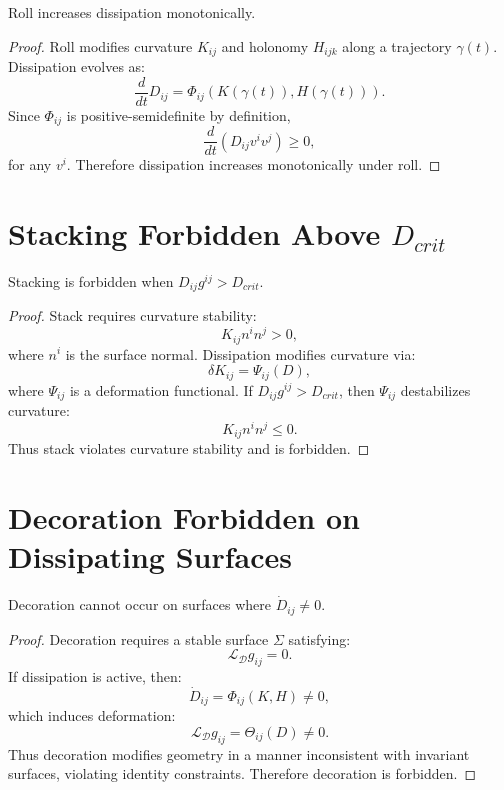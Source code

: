 \documentclass[12pt]{article}
\begin{document}
\begin{lemma}
Roll increases dissipation monotonically.
\end{lemma}

\begin{proof}
Roll modifies curvature $K_{ij}$ and holonomy $H_{ijk}$ along a trajectory
$\gamma(t)$. Dissipation evolves as:
\[
\frac{d}{dt} D_{ij} = \Phi_{ij}(K(\gamma(t)), H(\gamma(t))).
\]
Since $\Phi_{ij}$ is positive-semidefinite by definition,
\[
\frac{d}{dt} (D_{ij} v^i v^j) \ge 0,
\]
for any $v^i$. Therefore dissipation increases monotonically under roll.
\end{proof}

\section{Stacking Forbidden Above $D_{crit}$}

\begin{lemma}
Stacking is forbidden when $D_{ij} g^{ij} > D_{crit}$.
\end{lemma}

\begin{proof}
Stack requires curvature stability:
\[
K_{ij} n^i n^j > 0,
\]
where $n^i$ is the surface normal. Dissipation modifies curvature via:
\[
\delta K_{ij} = \Psi_{ij}(D),
\]
where $\Psi_{ij}$ is a deformation functional. If $D_{ij} g^{ij} > D_{crit}$,
then $\Psi_{ij}$ destabilizes curvature:
\[
K_{ij} n^i n^j \le 0.
\]
Thus stack violates curvature stability and is forbidden.
\end{proof}

\section{Decoration Forbidden on Dissipating Surfaces}

\begin{theorem}
Decoration cannot occur on surfaces where $\dot{D}_{ij} \neq 0$.
\end{theorem}

\begin{proof}
Decoration requires a stable surface $\Sigma$ satisfying:
\[
\mathcal{L}_{\mathcal{D}} g_{ij} = 0.
\]
If dissipation is active, then:
\[
\dot{D}_{ij} = \Phi_{ij}(K, H) \neq 0,
\]
which induces deformation:
\[
\mathcal{L}_{\mathcal{D}} g_{ij} = \Theta_{ij}(D) \neq 0.
\]
Thus decoration modifies geometry in a manner inconsistent with invariant
surfaces, violating identity constraints. Therefore decoration is forbidden.
\end{proof}
\end{document}
